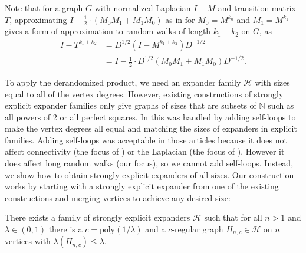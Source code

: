 \documentclass{toc}
\numberwithin{myalgctr}{section}
\theoremstyle{named}
\begin{document}
Note that for a graph $G$ with normalized Laplacian $I-M$ and transition matrix $T$, approximating $I-\frac{1}{2}\cdot(M_0M_1+M_1M_0)$ as in  for $M_0=M^{k_0}$ and $M_1=M^{k_1}$ gives a form of approximation to random walks of length $k_1+k_2$ on $G$, as 
\begin{align*}
I-T^{k_1+k_2} &= D^{1/2}(I-M^{k_1+k_2})D^{-1/2} \\
&=I-\frac{1}{2}\cdot D^{1/2}(M_0M_1+M_1M_0)D^{-1/2}.
\end{align*}

To apply the derandomized product, we need an expander family $\mathcal{H}$ with sizes equal to all of the vertex degrees. However, existing constructions of strongly explicit expander families only give graphs of sizes that are subsets of $\mathbb{N}$ such as all powers of 2 or all perfect squares. In \cite{RozenmanVa05, derandbeyond2017} this was handled by adding self-loops to make the vertex degrees all equal and matching the sizes of expanders in explicit families. Adding self-loops was acceptable in those
%
articles  %
because it does not affect connectivity (the focus of \cite{RozenmanVa05}) or the Laplacian (the focus of \cite{derandbeyond2017}). However it does affect long random walks (our focus), so we cannot add self-loops. Instead, we show how to obtain strongly explicit expanders of all sizes. Our construction works by starting with a strongly explicit expander from one of the existing constructions and merging vertices to achieve any desired size: 

\begin{theorem}
\label{thm:expanders}
There exists a family of strongly explicit expanders $\mathcal{H}$ such that for all $n>1$ and $\lambda\in(0,1)$ there is a $c=\mathrm{poly}(1/\lambda)$ and a $c$-regular graph $H_{n,c}\in \mathcal{H}$ on $n$ vertices with $\lambda(H_{n,c})\leq \lambda$.
\end{theorem}
\end{document}
